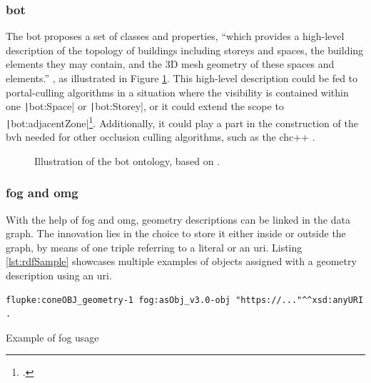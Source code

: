 \subsubsection{\acs{bot}}
The \ac{bot} proposes a set of classes and properties, \enquote{which provides a high-level description of the topology of buildings including storeys and spaces, the building elements they may contain, and the 3D mesh geometry of these spaces and elements.} \parencite{Rasmussen2020}, as illustrated in Figure \ref{fig:bot}. This high-level description could be fed to portal-culling algorithms in a situation where the visibility is contained within one \texttt|bot:Space| or \texttt|bot:Storey|, or it could extend the scope to \texttt|bot:adjacentZone|\footcite{GodotPortal}. Additionally, it could play a part in the construction of the \ac{bvh} needed for other occlusion culling algorithms, such as the \ac{chc}++ \parencite{Johansson2015}.

\begin{figure}[H]
    \begin{adjustwidth}{-0.8cm}{-0.8cm}
        \centering
        
        \vspace{-0.3cm}
        \caption[Illustration of the \acs{bot} ontology]{Illustration of the \acs{bot} ontology, based on \cite{Rasmussen2020}.}
        \label{fig:bot}
    \end{adjustwidth}
\end{figure}

\subsubsection{\acs{fog} and \acs{omg}} \label{sec:fog}
With the help of \ac{fog} and \ac{omg}, geometry descriptions can be linked in the data graph. The innovation lies in the choice to store it either inside or outside the graph, by means of one triple referring to a literal or an \ac{uri}. Listing \ref{lst:rdfSample} showcases multiple examples of objects assigned with a geometry description using an \ac{uri}\parencite{Bonduel2019}.

\begin{listing}[H]
    \begin{verbatim}
flupke:coneOBJ_geometry-1 fog:asObj_v3.0-obj "https://..."^^xsd:anyURI .
    \end{verbatim}
    \vspace{-0.7cm}
    \caption{Example of \acs{fog} usage}
    \label{lst:fogSample}
\end{listing}

